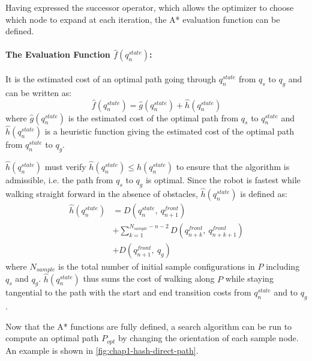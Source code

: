 Having expressed the successor operator, which allows the optimizer to
choose which node to expand at each iteration, the A* evaluation
function can be defined.

\paragraph{The Evaluation Function $\hat{f}(q_n^{state})$:}
It is the estimated cost of an optimal path going through
$q_n^{state}$ from $q_s$ to $q_g$ and can be written as:
\begin{equation}
  \hat{f}(q_n^{state}) = \hat{g}(q_n^{state}) + \hat{h}(q_n^{state})
\end{equation}
where $\hat{g}(q_n^{state})$ is the estimated cost of the optimal path
from $q_s$ to $q_n^{state}$ and $\hat{h}(q_n^{state})$ is a heuristic
function giving the estimated cost of the optimal path from
$q_n^{state}$ to $q_g$.

$\hat{h}(q_n^{state})$ must verify $\hat{h}(q_n^{state}) \leq
h(q_n^{state})$ to ensure that the algorithm is admissible, i.e. the
path from $q_s$ to $q_g$ is optimal. Since the robot is fastest while
walking straight forward in the absence of obstacles,
$\hat{h}(q_n^{state})$ is defined as:
\begin{equation}
  \begin{split}
  \hat{h}(q_n^{state}) &= D(q_n^{state},~q_{n+1}^{front}) \\
  &+ \sum_{k=1}^{N_{sample}-n-2} D(q_{n+k}^{front},~q_{n+k+1}^{front}) \\
  &+ D(q_{n+1}^{front},~q_g)
  \end{split}
\end{equation}
where $N_{sample}$ is the total number of initial sample
configurations in $P$ including $q_s$ and
$q_g$. $\hat{h}(q_n^{state})$ thus sums the cost of walking along $P$
while staying tangential to the path with the start and
end transition costs from $q_n^{state}$ and to $q_g$.

Now that the A* functions are fully defined, a search algorithm can be
run to compute an optimal path $P_{opt}$ by changing the orientation
of each sample node. An example is shown in
\autoref{fig:chap1-hash-direct-path}.

